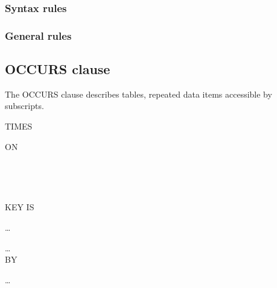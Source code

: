 \subsubsection{Syntax rules}

\subsubsection{General rules}

\subsection{OCCURS clause}

The OCCURS clause describes tables, repeated data items accessible by subscripts.

\begin{syntax}

  \begin{1=}
    \integer
    \begin{0-1}
       \integer
    \end{0-1}
    TIMES
    \begin{0-1}
       ON \identifier
    \end{0-1} \\

  \end{1=}

  \begin{0+} %
    \begin{1=}
      \begin{1=}
         \\
      \end{1=}
      KEY IS
      \begin{1=}
        \identifier
      \end{1=}\ldots
    \end{1=}\ldots \\

     BY
    \begin{1=}
      \cobolindexname
    \end{1=}\ldots
  \end{0+}
\end{syntax}

